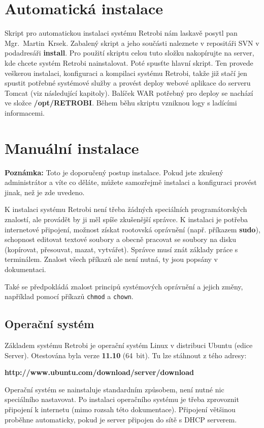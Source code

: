 \section{Automatická instalace}

Skript pro automatickou instalaci systému Retrobi nám laskavě posytl pan Mgr.~Martin~Krsek. Zabalený skript a jeho součásti naleznete v repositáři SVN v podadresáři {\bf install}. Pro použití skriptu celou tuto složku nakopírujte na server, kde chcete systém Retrobi nainstalovat. Poté spusťte hlavní skript. Ten provede veškerou instalaci, konfiguraci a kompilaci systému Retrobi, takže již stačí jen spustit potřebné systémové služby a provést deploy webové aplikace do serveru Tomcat (viz následující kapitoly). Balíček WAR potřebný pro deploy se nachází ve složce {\bf /opt/RETROBI}. Během běhu skriptu vzniknou logy s ladícími informacemi.

\section{Manuální instalace}

{\bf Poznámka:} Toto je doporučený postup instalace. Pokud jste zkušený administrátor a víte co děláte, můžete samozřejmě instalaci a konfiguraci provést jinak, než je zde uvedeno.

K instalaci systému Retrobi není třeba žádných speciálních programátorských znalostí, ale provádět by ji měl spíše zkušenější správce. K instalaci je potřeba internetové připojení, možnost získat rootovská oprávnění ({např. příkazem {\bf sudo}}), schopnost editovat textové soubory a obecně pracovat se soubory na disku (kopírovat, přesouvat, mazat, vytvářet). Správce musí znát základy práce s terminálem. Znalost všech příkazů ale není nutná, ty jsou popsány v dokumentaci.

Také se předpokládá znalost principů systémových oprávnění a jejich změny, například pomocí příkazů {\tt chmod} a {\tt chown}.

\subsection{Operační systém}

Základem systému Retrobi je operační systém Linux v distribuci Ubuntu (edice Server). Otestována byla verze {\bf 11.10} (64~bit). Tu lze stáhnout z tého adresy:

{\bf http://www.ubuntu.com/download/server/download}

Operační systém se nainstaluje standardním způsobem, není nutné nic speciálního nastavovat. Po instalaci operačního systému je třeba zprovoznit připojení k internetu (mimo rozsah této dokumentace). Připojení většinou proběhne automaticky, pokud je server připojen do sítě s DHCP serverem.

